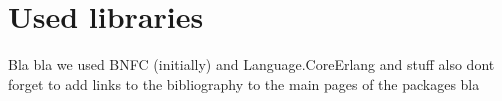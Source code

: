 \section{Used libraries}

Bla bla we used BNFC (initially) and Language.CoreErlang and stuff also dont forget to add links to the bibliography to the main pages of the packages bla

